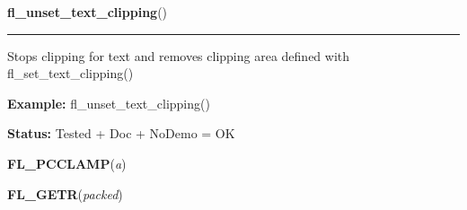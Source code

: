     \label{xformslib:flxbasic:fl_unset_text_clipping}

    \vspace{0.5ex}

\hspace{.8\funcindent}\begin{boxedminipage}{\funcwidth}

    \raggedright \textbf{fl\_unset\_text\_clipping}()

    \vspace{-1.5ex}

    \rule{\textwidth}{0.5\fboxrule}
\setlength{\parskip}{2ex}
    Stops clipping for text and removes clipping area defined with 
    fl\_set\_text\_clipping()

\setlength{\parskip}{1ex}
\textbf{Example:} fl\_unset\_text\_clipping()



\textbf{Status:} Tested + Doc + NoDemo = OK



    \end{boxedminipage}

    \label{xformslib:flxbasic:FL_PCCLAMP}

    \vspace{0.5ex}

\hspace{.8\funcindent}\begin{boxedminipage}{\funcwidth}

    \raggedright \textbf{FL\_PCCLAMP}(\textit{a})

\setlength{\parskip}{2ex}
\setlength{\parskip}{1ex}
    \end{boxedminipage}

    \label{xformslib:flxbasic:FL_GETR}

    \vspace{0.5ex}

\hspace{.8\funcindent}\begin{boxedminipage}{\funcwidth}

    \raggedright \textbf{FL\_GETR}(\textit{packed})

\setlength{\parskip}{2ex}
\setlength{\parskip}{1ex}
    \end{boxedminipage}

